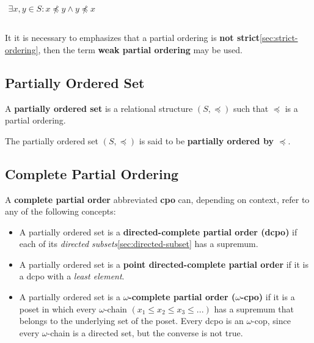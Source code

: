 \begin{math}
  \begin{array}{c}
    \\
    \exists x, y \in S : x \npreceq y \land y \npreceq x \\
    \\
  \end{array}
\end{math}


It it is necessary to emphasizes that a partial ordering is
\textbf{not strict}\ref{sec:strict-ordering}, then the term
\textbf{weak partial ordering} may be used.


\subsection{Partially Ordered Set}
\label{sec:poset}

A \textbf{partially ordered set} is a relational structure
$(S, \preceq)$ such that $\preceq$ is a partial ordering.

The partially ordered set $(S, \preceq)$ is said to be
\textbf{partially ordered by $\preceq$}.



\subsection{Complete Partial Ordering}
\label{sec:cpo}

A \textbf{complete partial order} abbreviated \textbf{cpo} can,
depending on context, refer to any of the following concepts:

\begin{itemize}
\item A partially ordered set is a \textbf{directed-complete partial
    order (dcpo)} if each of its \textit{directed
    subsets}\ref{sec:directed-subset} has a supremum.
\item A partially ordered set is a \textbf{point directed-complete
    partial order} if it is a dcpo with a \textit{least element}.
\item A partially ordered set is a \textbf{$\omega$-complete partial
    order ($\omega$-cpo)} if it is a poset in which every
  $\omega$-chain $(x_1 \leq x_2 \leq x_3 \leq ...)$ has a supremum
  that belongs to the underlying set of the poset. Every dcpo is an
  $\omega$-cop, since every $\omega$-chain is a directed set, but the
  converse is not true.
\end{itemize}


